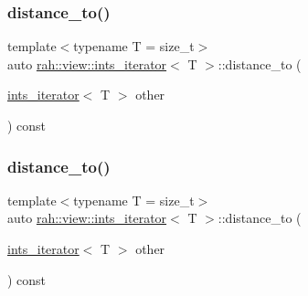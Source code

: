 \subsubsection{\texorpdfstring{distance\_to()}{distance\_to()}\hspace{0.1cm}{\footnotesize\ttfamily [1/2]}}
{\footnotesize\ttfamily template$<$typename T  = size\+\_\+t$>$ \\
auto \mbox{\hyperlink{structrah_1_1view_1_1ints__iterator}{rah\+::view\+::ints\+\_\+iterator}}$<$ T $>$\+::distance\+\_\+to (\begin{DoxyParamCaption}\item[{\mbox{\hyperlink{structrah_1_1view_1_1ints__iterator}{ints\+\_\+iterator}}$<$ T $>$}]{other }\end{DoxyParamCaption}) const\hspace{0.3cm}{\ttfamily [inline]}}

\mbox{\label{structrah_1_1view_1_1ints__iterator_affcacb2301246c7c9972c06a86b952ce}} 
\subsubsection{\texorpdfstring{distance\_to()}{distance\_to()}\hspace{0.1cm}{\footnotesize\ttfamily [2/2]}}
{\footnotesize\ttfamily template$<$typename T  = size\+\_\+t$>$ \\
auto \mbox{\hyperlink{structrah_1_1view_1_1ints__iterator}{rah\+::view\+::ints\+\_\+iterator}}$<$ T $>$\+::distance\+\_\+to (\begin{DoxyParamCaption}\item[{\mbox{\hyperlink{structrah_1_1view_1_1ints__iterator}{ints\+\_\+iterator}}$<$ T $>$}]{other }\end{DoxyParamCaption}) const\hspace{0.3cm}{\ttfamily [inline]}}

\mbox{\label{structrah_1_1view_1_1ints__iterator_a5360257e3f004cd3cbbf14f779cace0b}} 
